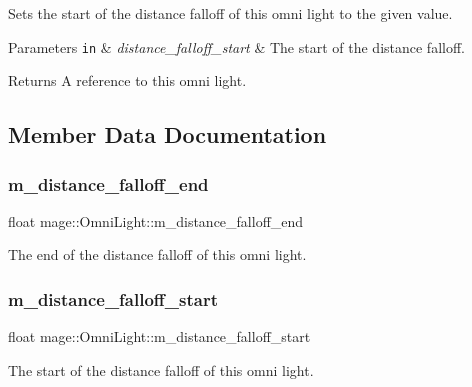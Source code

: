 Sets the start of the distance falloff of this omni light to the given value.


\begin{DoxyParams}[1]{Parameters}
\mbox{\tt in}  & {\em distance\+\_\+falloff\+\_\+start} & The start of the distance falloff. \\
\hline
\end{DoxyParams}
\begin{DoxyReturn}{Returns}
A reference to this omni light. 
\end{DoxyReturn}


\subsection{Member Data Documentation}
\hypertarget{classmage_1_1_omni_light_a4ee5cc4103305dc96b43d6286858ef74}{}\label{classmage_1_1_omni_light_a4ee5cc4103305dc96b43d6286858ef74} 
\subsubsection{\texorpdfstring{m\+\_\+distance\+\_\+falloff\+\_\+end}{m\_distance\_falloff\_end}}
{\footnotesize\ttfamily float mage\+::\+Omni\+Light\+::m\+\_\+distance\+\_\+falloff\+\_\+end\hspace{0.3cm}{\ttfamily [private]}}

The end of the distance falloff of this omni light. \hypertarget{classmage_1_1_omni_light_ab784744d39ad3d4f4a7b2214a55108f7}{}\label{classmage_1_1_omni_light_ab784744d39ad3d4f4a7b2214a55108f7} 
\subsubsection{\texorpdfstring{m\+\_\+distance\+\_\+falloff\+\_\+start}{m\_distance\_falloff\_start}}
{\footnotesize\ttfamily float mage\+::\+Omni\+Light\+::m\+\_\+distance\+\_\+falloff\+\_\+start\hspace{0.3cm}{\ttfamily [private]}}

The start of the distance falloff of this omni light. 